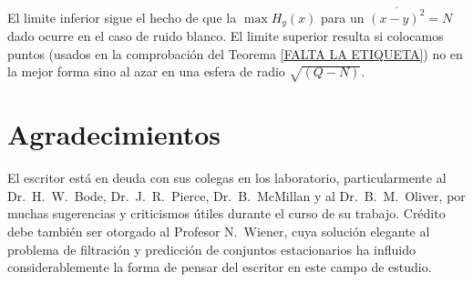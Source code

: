 El limite inferior sigue el hecho de que la $\max H_{y}(x)$ para un
$\overline{(x - y)^{2}} = N$ dado ocurre en el caso de ruido
blanco. El limite superior resulta si colocamos puntos (usados en la
comprobaci\'on del Teorema \ref{FALTA LA ETIQUETA}) no en la mejor
forma sino al azar en una esfera de radio $\sqrt{(Q - N)}$.

\clearpage

\chapter*{Agradecimientos}

El escritor est\'{a} en deuda con sus colegas en los laboratorio,
particularmente al Dr.\ H.\ W.\ Bode, Dr.\ J.\ R.\ Pierce,
Dr.\ B.\ McMillan y al Dr.\ B.\ M.\ Oliver, por muchas sugerencias y
criticismos \'utiles durante el curso de su trabajo. Cr\'{e}dito debe
tambi\'en ser otorgado al Profesor N.\ Wiener, cuya soluci\'on
elegante al problema de filtraci\'on y predicci\'on de conjuntos
estacionarios ha influido considerablemente la forma de pensar del
escritor en este campo de estudio.

\clearpage

